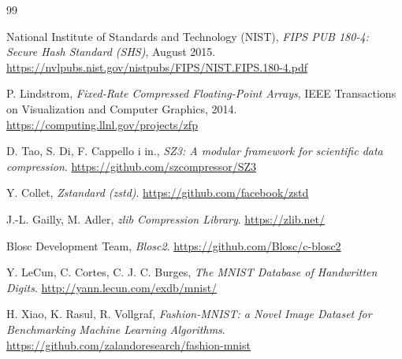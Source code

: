 \documentclass[11pt,a4paper]{article}
\begin{document}
\begin{thebibliography}{99}

National Institute of Standards and Technology (NIST),
\emph{FIPS PUB 180-4: Secure Hash Standard (SHS)}, August 2015.
\url{https://nvlpubs.nist.gov/nistpubs/FIPS/NIST.FIPS.180-4.pdf}

P. Lindstrom,
\emph{Fixed-Rate Compressed Floating-Point Arrays},
IEEE Transactions on Visualization and Computer Graphics, 2014.
\url{https://computing.llnl.gov/projects/zfp}

D. Tao, S. Di, F. Cappello i in.,
\emph{SZ3: A modular framework for scientific data compression}.
\url{https://github.com/szcompressor/SZ3}

Y. Collet,
\emph{Zstandard (zstd)}.
\url{https://github.com/facebook/zstd}

J.-L. Gailly, M. Adler,
\emph{zlib Compression Library}.
\url{https://zlib.net/}

Blosc Development Team,
\emph{Blosc2}.
\url{https://github.com/Blosc/c-blosc2}

Y. LeCun, C. Cortes, C. J. C. Burges,
\emph{The MNIST Database of Handwritten Digits}.
\url{http://yann.lecun.com/exdb/mnist/}

H. Xiao, K. Rasul, R. Vollgraf,
\emph{Fashion-MNIST: a Novel Image Dataset for Benchmarking Machine Learning Algorithms}.
\url{https://github.com/zalandoresearch/fashion-mnist}

\end{thebibliography}
\end{document}
